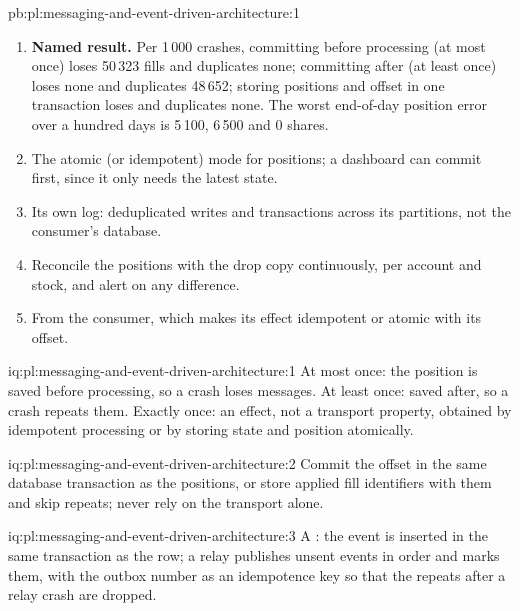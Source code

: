 \begin{solution}{pb:pl:messaging-and-event-driven-architecture:1}
\begin{enumerate}
\item \textbf{Named result.} Per 1\,000 crashes, committing before processing (at most once) loses 50\,323 fills and duplicates none;
committing after (at least once) loses none and duplicates 48\,652; storing positions and offset in one transaction loses and duplicates
none. The worst end-of-day position error over a hundred days is 5\,100, 6\,500 and 0 shares.
\item The atomic (or idempotent) mode for positions; a dashboard can commit first, since it only needs the latest state.
\item Its own log: deduplicated writes and transactions across its partitions, not the consumer's database.
\item Reconcile the positions with the drop copy continuously, per account and stock, and alert on any difference.
\item From the consumer, which makes its effect idempotent or atomic with its offset.
\end{enumerate}
\end{solution}

\begin{solution}{iq:pl:messaging-and-event-driven-architecture:1}
At most once: the position is saved before processing, so a crash loses messages. At least once: saved after, so a crash repeats them.
Exactly once: an effect, not a transport property, obtained by idempotent processing or by storing state and position atomically.
\end{solution}

\begin{solution}{iq:pl:messaging-and-event-driven-architecture:2}
Commit the offset in the same database transaction as the positions, or store applied fill identifiers with them and skip repeats; never
rely on the transport alone.
\end{solution}

\begin{solution}{iq:pl:messaging-and-event-driven-architecture:3}
A : the event is inserted in the same transaction as the row; a relay publishes unsent events in order and marks them,
with the outbox number as an idempotence key so that the repeats after a relay crash are dropped.
\end{solution}

